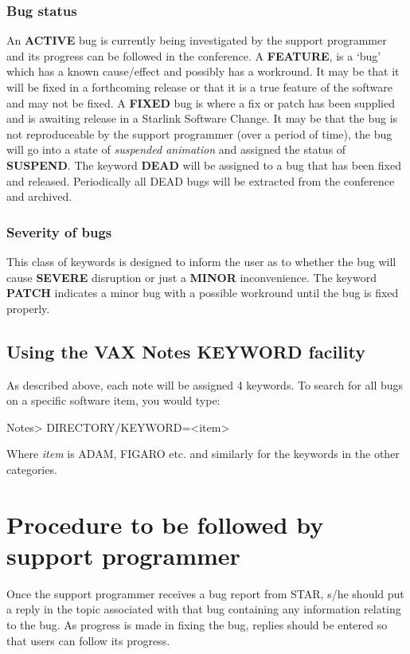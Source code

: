 \documentclass[twoside,11pt,nolof,noabs]{starlink}
\begin{document}
\subsubsection{Bug status}
An \textbf{ACTIVE} bug is currently being investigated by the support programmer
and its progress can be followed in the conference. A \textbf{FEATURE}, is a `bug'
which has a known cause/effect and possibly has a workround.
It may be that it will be
fixed in a forthcoming release or that it is a true feature of the software and
may not be fixed. A \textbf{FIXED} bug is where a fix or patch has been supplied
and is awaiting release in a Starlink Software Change. It may be that the bug
is not reproduceable by the support programmer (over a period of time), the
bug will go into a state of \emph{suspended animation} and assigned the status
of \textbf{SUSPEND}. The keyword \textbf{DEAD} will be assigned to a bug that has
been fixed and released. Periodically all DEAD bugs will be extracted from the
conference and archived.
\subsubsection{Severity of bugs}
This class of keywords is designed to inform the user as to whether the bug
will cause \textbf{SEVERE} disruption or just a \textbf{MINOR} inconvenience. The
keyword \textbf{PATCH} indicates a minor bug with a possible workround
until the bug is fixed properly.
\subsection{Using the VAX Notes KEYWORD facility}
As described above, each note will be assigned 4 keywords. To search for all
bugs on a specific software item, you would type:
\begin{terminalv}
Notes> DIRECTORY/KEYWORD=<item>
\end{terminalv}
Where \emph{item} is ADAM, FIGARO  etc.
and similarly for the keywords in the other categories.
\newpage
\section{Procedure to be followed by support programmer}
Once the support programmer receives a bug report from STAR, s/he should put a
reply in the topic associated with that bug containing any information relating
to the bug. As progress is made in fixing the bug, replies should be entered
so that users can follow its progress.
\end{document}
